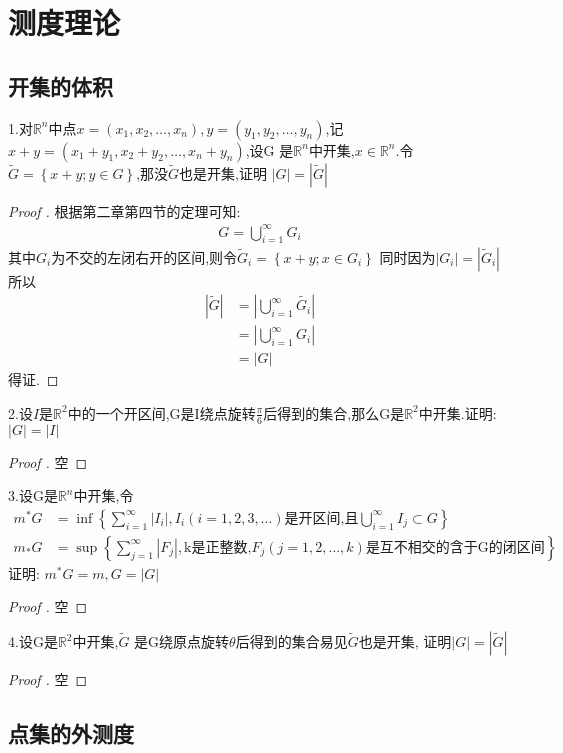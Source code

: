 \chapter{测度理论} %
\label{chap:测度理论}
\section{开集的体积} %
\label{sec:开集的体积}
1.对\(\mathbb{R}^n\)中点\(x = (x_1,x_2 ,\dots ,x_n),y=(y_1,y_2,\dots,y_n)\),记\(x+y = (x_1 + y_1 ,x_2+y_2,\dots ,x_n+y_n)\),设G
是\(\mathbb{R}^n\)中开集,\(x\in \mathbb{R}^n \).令\(\widetilde{G}=\left\{x+y ; y\in G\right\}\),那没\(\widetilde{G}\)也是开集,证明
\(|G|=|\widetilde{G}|\)
\begin{proof}[Proof ]
  根据第二章第四节的定理可知: \begin{align*}
    G = \bigcup\limits_{i=1}^{\infty} G_i 
  \end{align*} 
  其中\(G_i\)为不交的左闭右开的区间,则令\(\widetilde{G}_i =\left\{x+y ; x \in G_i \right\} \)
  同时因为\(|G_i| =|\widetilde{G}_i| \)
  所以
  \begin{align*}
    |\widetilde{G}| &= |\bigcup\limits_{i=1}^{\infty} \widetilde{G_i}| \\
    &= |\bigcup\limits_{i=1}^{\infty} G_i| \\
    &=|G|
  \end{align*}
  得证.
\end{proof}
2.设\(I\)是\(\mathbb{R}^2\)中的一个开区间,G是I绕点旋转\(\frac{\pi}{6}\)后得到的集合,那么G是\(\mathbb{R}^2 \)中开集.证明:\(|G|=|I|\)
\begin{proof}[Proof ]
 空 
\end{proof}
3.设G是\(\mathbb{R}^n \)中开集,令
\begin{align*}
  m^{*}G &= \inf\left\{\sum_{i=1}^{\infty}|I_i| , I_i (i=1,2,3,\dots ) \text{是开区间,且} \bigcup\limits_{i=1}^{\infty} I_j \subset G \right\}
  \\ 
  m_{*}G &= \sup\left\{\sum_{j=1}^{\infty}|F_j| ,\text{k是正整数,} F_j (j=1,2,\dots , k) \text{是互不相交的含于G的闭区间}\right\}
\end{align*}
证明: \(m^{*}G =m, G=|G| \)
\begin{proof}[Proof ]
 空 
\end{proof}
4.设G是\(\mathbb{R}^2 \)中开集,\(\widetilde{G}\) 是G绕原点旋转\(\theta\)后得到的集合易见\(\widetilde{G}\)也是开集,
证明\(|G| = |\widetilde{G}| \)
\begin{proof}[Proof ]
  空  
\end{proof}
\section{点集的外测度} %
\label{sec:点集的外测度}

